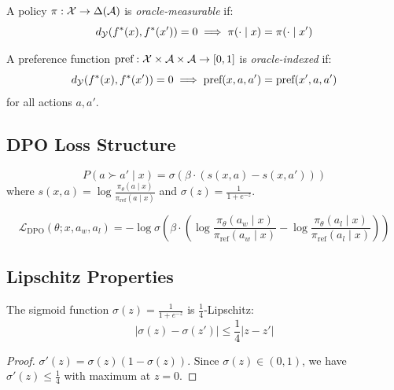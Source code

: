 \begin{definition}
A policy $\pi: \mathcal{X} \to \Delta(\mathcal{A})$ is \emph{oracle-measurable} if:
\[
d_{\mathcal{Y}}(f^{\ast}(x), f^{\ast}(x')) = 0 \implies \pi(\cdot \mid x) = \pi(\cdot \mid x')
\]
\end{definition}

\begin{definition}
A preference function $\text{pref}: \mathcal{X} \times \mathcal{A} \times \mathcal{A} \to [0, 1]$ is \emph{oracle-indexed} if:
\[
d_{\mathcal{Y}}(f^{\ast}(x), f^{\ast}(x')) = 0 \implies \text{pref}(x, a, a') = \text{pref}(x', a, a')
\]
for all actions $a, a'$.
\end{definition}

\subsection{DPO Loss Structure}

\begin{definition}
\[
P(a \succ a' \mid x) = \sigma(\beta \cdot (s(x, a) - s(x, a')))
\]
where $s(x, a) = \log \frac{\pi_\theta(a \mid x)}{\pi_{\text{ref}}(a \mid x)}$ and $\sigma(z) = \frac{1}{1 + e^{-z}}$.
\end{definition}

\begin{definition}
\[
\mathcal{L}_{\text{DPO}}(\theta; x, a_w, a_l) = -\log \sigma\left(\beta \cdot \left(\log \frac{\pi_\theta(a_w \mid x)}{\pi_{\text{ref}}(a_w \mid x)} - \log \frac{\pi_\theta(a_l \mid x)}{\pi_{\text{ref}}(a_l \mid x)}\right)\right)
\]
\end{definition}

\subsection{Lipschitz Properties}

\begin{lemma}\label{lem:sigmoid-lip}
The sigmoid function $\sigma(z) = \frac{1}{1+e^{-z}}$ is $\frac{1}{4}$-Lipschitz:
\[
|\sigma(z) - \sigma(z')| \le \frac{1}{4}|z - z'|
\]
\end{lemma}

\begin{proof}
$\sigma'(z) = \sigma(z)(1 - \sigma(z))$. Since $\sigma(z) \in (0, 1)$, we have $\sigma'(z) \le \frac{1}{4}$ with maximum at $z = 0$.
\end{proof}


